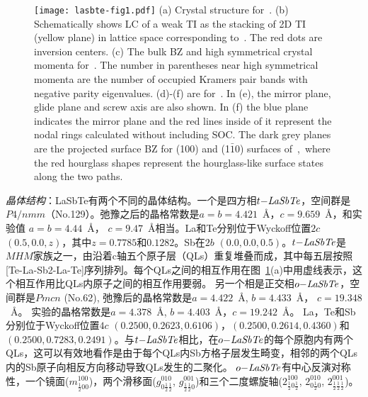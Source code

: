 \begin{figure}[!t]
    \centering
    \texttt{[image: lasbte-fig1.pdf]}
    {(a) Crystal structure for~\ti. (b) Schematically shows LC of a weak TI as the stacking of 2D TI (yellow plane) in lattice space corresponding to~\ti. The red dots are inversion centers.
    (c) The bulk BZ and high symmetrical crystal momenta for~\ti. The number in parentheses near high symmetrical momenta are the number of occupied Kramers pair bands with negative parity eigenvalues. (d)-(f) are for~\tci. In (e), the mirror plane, glide plane and screw axis are also shown. In (f) the blue plane indicates the mirror plane and the red lines inside of it represent the nodal rings calculated without including SOC. The dark grey planes are the projected surface BZ for (100) and (1$\bar 1$0) surfaces of~\tci,~where the red hourglass shapes represent the hourglass-like surface states along the two paths. ~\citep{qian2020layer}
    }
    \label{fig:3-1}
\end{figure}
{\it{晶体结构}}：LaSbTe有两个不同的晶体结构。一个是四方相$t\it{-LaSbTe}$，空间群是$P4/nmm$（No.129）。弛豫之后的晶格常数是$a=b=4.421$~\AA，$c=9.659$~\AA，和实验值 $a=b=4.44$~\AA， $c= 9.47$~\AA 相当。La和Te分别位于Wyckoff位置$2c$ $(0.5, 0.0, z)$，其中$z=0.7785$和$0.1282$。Sb在$2b$ $(0.0, 0.0, 0.5)$。$t\it{-LaSbTe}$是$MHM$家族之一，由沿着c轴五个原子层（QLs）重复堆叠而成，其中每五层按照[Te-La-Sb2-La-Te]序列排列。每个QLs之间的相互作用在图~\ref{fig:3-1}(a)中用虚线表示，这个相互作用比QLs内原子之间的相互作用要弱。
另一个相是正交相$o\it{-LaSbTe}$，空间群是$Pmcn$ (No.62), 弛豫后的晶格常数是$a=4.422$~\AA, $b=4.433$~\AA， $c=19.348$~\AA。 实验的晶格常数是$a=4.378$~\AA, $b=4.403$~\AA，$c=19.242$~\AA。 La，Te和Sb分别位于Wyckoff位置$4c$ $(0.2500,0.2623,0.6106)$，$(0.2500,0.2614, 0.4360)$和$(0.2500,0.7283,0.2491)$。与$t\it{-LaSbTe}$相比，在$o\it{-LaSbTe}$的每个原胞内有两个QLs，这可以有效地看作是由于每个QLs内Sb方格子层发生畸变，相邻的两个QLs内的Sb原子向相反方向移动导致QLs发生的二聚化。
$o\it{-LaSbTe}$有中心反演对称性，一个镜面($m^{100}_{\frac{1}{2}00 }$)，两个滑移面($g^{010}_{0\frac{1}{2}\frac{1}{2}}$, $g^{001}_{\frac{1}{2}\frac{1}{2}0}$)和三个二度螺旋轴($2^{100}_{ \frac{1}{2}0\frac{1}{2}}$, $2^{010}_{0 \frac{1}{2}0}$, $2^{001}_{\frac{1}{2}\frac{1}{2}\frac{1}{2}}$)。



